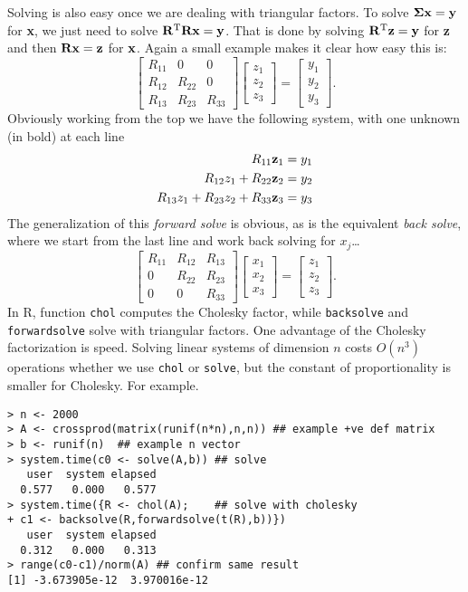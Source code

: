 \documentclass[10pt] {article}
\newcommand{\ts}{^{\rm T}}
\newcommand{\bmat}[1]{\left [ \begin{array}{#1}}
\newcommand{\emat}{\end{array}\right ]}
\theoremstyle{definition}
\begin{document}
Solving is also easy once we are dealing with triangular factors. To solve ${\bm \Sigma} {\bf x} = {\bf y}$ for {\bf x}, we just need to solve ${\bf R}\ts {\bf Rx} = {\bf y} $. That is done by solving ${\bf R}\ts {\bf z} = {\bf y}$ for {\bf z} and then ${\bf Rx} = {\bf z}$ for $\bf x$. Again a small example makes it clear how easy this is:
$$
\bmat{ccc} 
R_{11} & 0 & 0 \\ R_{12} & R_{22} & 0 \\ R_{13} & R_{23} & R_{33}  
\emat \bmat{c} z_1 \\ z_2 \\ z_3 \emat = \bmat{c} y_1 \\ y_2 \\ y_3 \emat.
$$ 
Obviously working from the top we have the following system, with one unknown (in bold) at each line
\begin{align*}
R_{11} {\bf z}_1 &= y_1\\
R_{12} z_1 + R_{22} {\bf z}_2 & = y_2\\
R_{13} z_1 + R_{23} z_2 + R_{33} {\bf z}_3 &= y_3 
\end{align*}
The generalization of this {\em forward solve} is obvious, as is the equivalent {\em  back solve}, where we start from the last line and work back solving for $x_j$\ldots
$$
\bmat{ccc} 
R_{11} & R_{12} & R_{13} \\
0 & R_{22} & R_{23} \\
0 & 0 & R_{33}
\emat \bmat{c} x_1 \\ x_2 \\ x_3 \emat = \bmat{c} z_1 \\ z_2 \\ z_3 \emat.
$$  
In R, function {\tt chol} computes the Cholesky factor, while {\tt backsolve} and {\tt forwardsolve} solve with triangular factors. One advantage of the Cholesky factorization is speed. Solving linear systems of dimension $n$ costs $O(n^3)$ operations whether we use {\tt chol} or {\tt solve}, but the constant of proportionality is smaller for Cholesky. For example.
\begin{lstlisting}
> n <- 2000
> A <- crossprod(matrix(runif(n*n),n,n)) ## example +ve def matrix
> b <- runif(n)  ## example n vector
> system.time(c0 <- solve(A,b)) ## solve 
   user  system elapsed 
  0.577   0.000   0.577 
> system.time({R <- chol(A);    ## solve with cholesky
+ c1 <- backsolve(R,forwardsolve(t(R),b))})
   user  system elapsed 
  0.312   0.000   0.313 
> range(c0-c1)/norm(A) ## confirm same result
[1] -3.673905e-12  3.970016e-12
\end{lstlisting}
\end{document}
